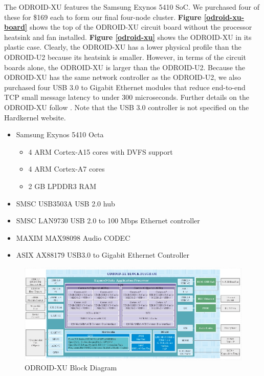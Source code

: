 \documentclass[11pt]{book}
\begin{document}
The ODROID-XU features the Samsung Exynos 5410 SoC. We purchased four of these
for \$169 each to form our final four-node cluster. \textbf{Figure
  \ref{odroid-xu-board}} shows the top of the ODROID-XU circuit board without
the processor heatsink and fan installed. \textbf{Figure \ref{odroid-xu}} shows
the ODROID-XU in its plastic case. Clearly, the ODROID-XU has a lower physical
profile than the ODROID-U2 because its heatsink is smaller. However, in terms of
the circuit boards alone, the ODROID-XU is larger than the ODROID-U2. Because
the ODROID-XU has the same network controller as the ODROID-U2, we also
purchased four USB 3.0 to Gigabit Ethernet modules that reduce end-to-end TCP
small message latency to under 300 microseconds. Further details on the
ODROID-XU follow \cite{odroid-xu-board-detail}. Note that the USB 3.0 controller
is not specified on the Hardkernel website.

\begin{itemize}
\item Samsung Exynos 5410 Octa
  \begin{itemize}
  \item 4 ARM Cortex-A15 cores with DVFS support
  \item 4 ARM Cortex-A7 cores
  \item 2 GB LPDDR3 RAM
  \end{itemize}
\item SMSC USB3503A USB 2.0 hub
\item SMSC LAN9730 USB 2.0 to 100 Mbps Ethernet controller
\item MAXIM MAX98098 Audio CODEC
\item ASIX AX88179 USB3.0 to Gigabit Ethernet Controller
\end{itemize}

\begin{figure}[h]
\centering
\includegraphics[width=\textwidth]{odroid_xu_block_diagram}
\caption{ODROID-XU Block Diagram \cite{odroid-xu-board-detail}}
\label{odroid-xu-block-diagram}
\end{figure}
\end{document}
